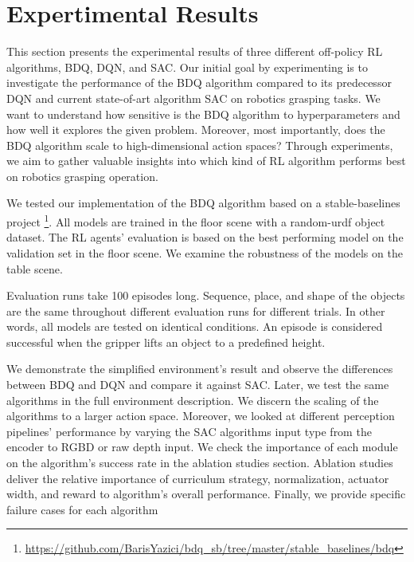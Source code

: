 
\chapter{Expertimental Results}\label{chapter:evaluation}

This section presents the experimental results of three different off-policy RL algorithms, BDQ, DQN, and SAC. Our initial goal by experimenting is to investigate the performance of the BDQ algorithm compared to its predecessor DQN and current state-of-art algorithm SAC on robotics grasping tasks. We want to understand how sensitive is the BDQ algorithm to hyperparameters and how well it explores the given problem. Moreover, most importantly, does the BDQ algorithm scale to high-dimensional action spaces? Through experiments, we aim to gather valuable insights into which kind of RL algorithm performs best on robotics grasping operation.

We tested our implementation of the BDQ algorithm based on a stable-baselines project \footnote{\url{https://github.com/BarisYazici/bdq_sb/tree/master/stable_baselines/bdq}}. All models are trained in the floor scene with a random-urdf object dataset. The RL agents' evaluation is based on the best performing model on the validation set in the floor scene. We examine the robustness of the models on the table scene.

Evaluation runs take 100 episodes long. Sequence, place, and shape of the objects are the same throughout different evaluation runs for different trials. In other words, all models are tested on identical conditions. An episode is considered successful when the gripper lifts an object to a predefined height.

We demonstrate the simplified environment's result and observe the differences between BDQ and DQN and compare it against SAC. Later, we test the same algorithms in the full environment description. We discern the scaling of the algorithms to a larger action space. Moreover, we looked at different perception pipelines' performance by varying the SAC algorithms input type from the encoder to RGBD or raw depth input. We check the importance of each module on the algorithm's success rate in the ablation studies section.  Ablation studies deliver the relative importance of curriculum strategy, normalization, actuator width, and reward to algorithm's overall performance. Finally, we provide specific failure cases for each algorithm


